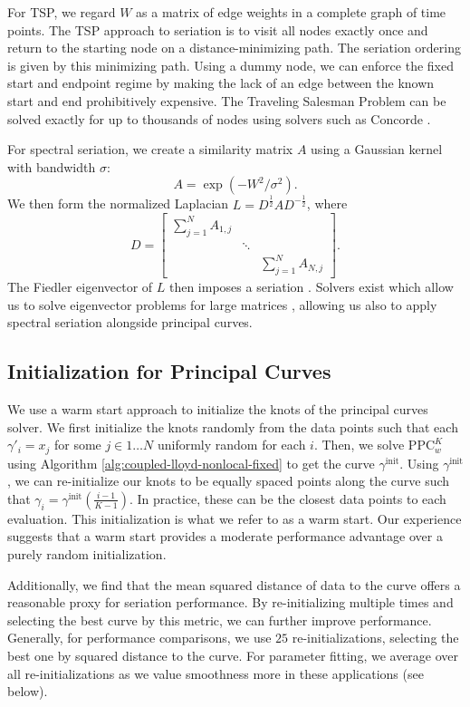 \documentclass[aos, preprint]{imsart}
\theoremstyle{plain}
\theoremstyle{remark}
\begin{document}
\begin{appendix}
For TSP, we regard $W$ as a matrix of edge weights in a complete graph of time points. The TSP approach to seriation is to visit all nodes exactly once and return to the starting node
on a distance-minimizing path. The seriation ordering is given by this minimizing path. Using a dummy node, we can enforce the fixed start and endpoint regime by making the lack of an edge between the known start and end prohibitively expensive. The Traveling Salesman Problem can be solved exactly for up to thousands of nodes using solvers such as Concorde \cite{applegate2006traveling_concorde}.

For spectral seriation, we create a similarity matrix $A$ using a Gaussian kernel with bandwidth $\sigma$:
\begin{equation*}
    A = \exp(-W^2/\sigma^2).
\end{equation*}
We then form the normalized Laplacian $L=D^{\frac12}AD^{-\frac12}$, where
$$
  D =
  \begin{bmatrix}
    \sum_{j=1}^N A_{1, j} & & \\
    & \ddots & \\
    & & \sum_{j=1}^N A_{N, j}
  \end{bmatrix}.
$$
The Fiedler eigenvector of $L$ then imposes a seriation \cite{atkins_spectral_1998}. Solvers exist which allow us to solve eigenvector problems for large matrices \cite{bientinesi_parallel_2005, marek_elpa_2014}, allowing us also to apply spectral seriation alongside principal curves.

\subsection*{Initialization for Principal Curves}
We use a warm start approach to initialize the knots of the principal curves solver. We first initialize the knots randomly from the data points such that each $\gamma'_i = x_j$ for some $j \in 1 \ldots N$ uniformly random for each $i$. Then, we solve $\textrm{PPC}^K_w$ using Algorithm \ref{alg:coupled-lloyd-nonlocal-fixed} to get the curve $\gamma^{\text{init}}$. Using $\gamma^{\text{init}}$, we can re-initialize our knots to be equally spaced points along the curve such that $\gamma_i = \gamma^{\text{init}}(\frac{i-1}{K-1})$. In practice, these can be the closest data points to each evaluation. This initialization is what we refer to as a warm start. Our experience suggests that a warm start provides a moderate performance advantage over a purely random initialization.

Additionally, we find that the mean squared distance of data to the curve offers a reasonable proxy for seriation performance. By re-initializing multiple times and selecting the best curve by this metric, we can further improve performance. Generally, for performance comparisons, we use $25$ re-initializations, selecting the best one by squared distance to the curve. For parameter fitting, we average over all re-initializations as we value smoothness more in these applications (see below).


\end{appendix}
\end{document}
